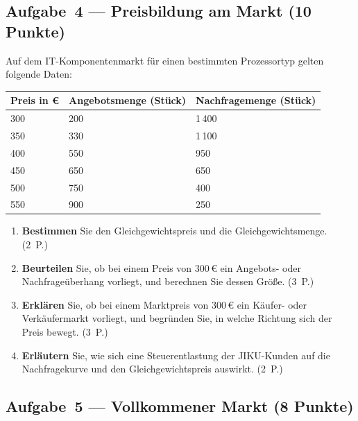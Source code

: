 \documentclass[11pt, a4paper]{article}
\begin{document}
\subsection*{Aufgabe~4 --- Preisbildung am Markt (10 Punkte)}

Auf dem IT-Komponentenmarkt für einen bestimmten Prozessortyp gelten folgende Daten:

\bigskip

\noindent
\begin{tabular}{|l|l|l|}
\hline
\textbf{Preis in €} & \textbf{Angebotsmenge (Stück)} & \textbf{Nachfragemenge (Stück)}\\
\hline
300 & 200 & 1\,400\\
\hline
350 & 330 & 1\,100\\
\hline
400 & 550 & 950\\
\hline
450 & 650 & 650\\
\hline
500 & 750 & 400\\
\hline
550 & 900 & 250\\
\hline
\end{tabular}

\begin{enumerate}[label=(\alph*)]
  \item \textbf{Bestimmen} Sie den Gleichgewichtspreis und die Gleichgewichtsmenge. \hfill (2~P.)

  \vspace{3cm}

  \item \textbf{Beurteilen} Sie, ob bei einem Preis von 300\,€ ein Angebots- oder
  Nachfrageüberhang vorliegt, und berechnen Sie dessen Größe. \hfill (3~P.)

  \vspace{4cm}

  \item \textbf{Erklären} Sie, ob bei einem Marktpreis von 300\,€ ein Käufer- oder
  Verkäufermarkt vorliegt, und begründen Sie, in welche Richtung sich der Preis bewegt. \hfill (3~P.)

  \vspace{4cm}

  \item \textbf{Erläutern} Sie, wie sich eine Steuerentlastung der JIKU-Kunden auf die
  Nachfragekurve und den Gleichgewichtspreis auswirkt. \hfill (2~P.)

  \vspace{3.5cm}
\end{enumerate}

\subsection*{Aufgabe~5 --- Vollkommener Markt (8 Punkte)}
\end{document}
